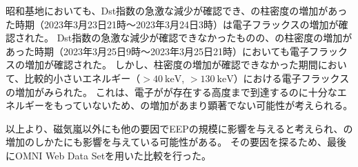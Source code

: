 昭和基地においても、Dst指数の急激な減少が確認でき、の柱密度の増加があった時期（2023年3月23日21時〜2023年3月24日3時）は電子フラックスの増加が確認された。
Dst指数の急激な減少が確認できなかったものの、の柱密度の増加があった時期（2023年3月25日9時〜2023年3月25日21時）においても電子フラックスの増加が確認された。
しかし、柱密度の増加が確認できなかった期間において、比較的小さいエネルギー（$>40\ \mathrm{keV}$, $>130\ \mathrm{keV}$）における電子フラックスの増加がみられた。
これは、電子がが存在する高度まで到達するのに十分なエネルギーをもっていないため、の増加があまり顕著でない可能性が考えられる。
\par

以上より、磁気嵐以外にも他の要因でEEPの規模に影響を与えると考えられ、の増加のしかたにも影響を与えている可能性がある。
その要因を探るため、最後にOMNI Web Data Setを用いた比較を行った。


